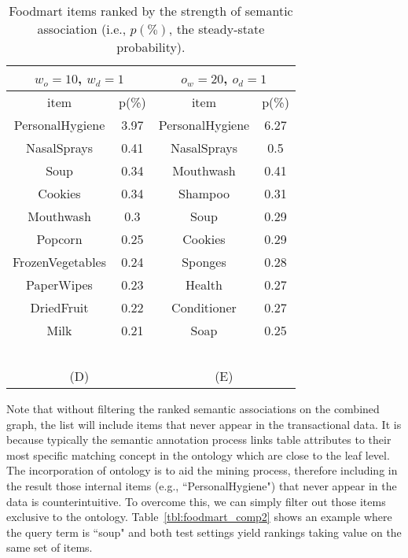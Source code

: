 \begin{table*}[tbh]
\begin{center}
\begin{tabular}{ c c || c c }
\hline
\multicolumn{2}{c||}{$w_o=10$, $w_d=1$}&\multicolumn{2}{c}{$o_w=20$, $o_d=1$}\\
\hline
item	&	p(\%)	&	item	&	p(\%)	\\
\hline																			
PersonalHygiene	&	3.97	&	 PersonalHygiene	&	6.27	\\
NasalSprays	&	0.41	&	NasalSprays	&	0.5	\\
Soup	&	0.34	&	Mouthwash	&	0.41	\\
Cookies	&	0.34	&	Shampoo	&	0.31	\\
Mouthwash	&	0.3	&	Soup	&	0.29	\\
Popcorn	&	0.25	&	Cookies	&	0.29	 \\
FrozenVegetables	&	0.24	&	Sponges	&	0.28	 \\
PaperWipes	&	0.23	&	Health	&	0.27	 \\
DriedFruit	&	0.22	&	Conditioner	&	0.27	\\
Milk	&	0.21	&	Soap	&	0.25	\\
\hline
\multicolumn{4}{c}{~}\\
\multicolumn{2}{c}{(D)}  &  \multicolumn{2}{c}{(E)}  \\
\end{tabular}
\end{center}
\caption[Top results on the Foodmart dataset.]{\label{tbl:foodmart_comp} Foodmart items ranked by the strength of semantic association (i.e., $p(\%)$, the steady-state probability).}
\end{table*}

Note that without filtering the ranked semantic associations on the combined graph, the list will include items that never appear in the transactional data. It is because typically the semantic annotation process links table attributes to their most specific matching concept in the ontology which are close to the leaf level. The incorporation of ontology is to aid the mining process, therefore including in the result those internal items (e.g., ``PersonalHygiene") that never appear in the data is counterintuitive. To overcome this, we can simply filter out those items exclusive to the ontology. Table~\ref{tbl:foodmart_comp2} shows an example where the query term is ``soup" and both test settings yield rankings taking value on the same set of items.



